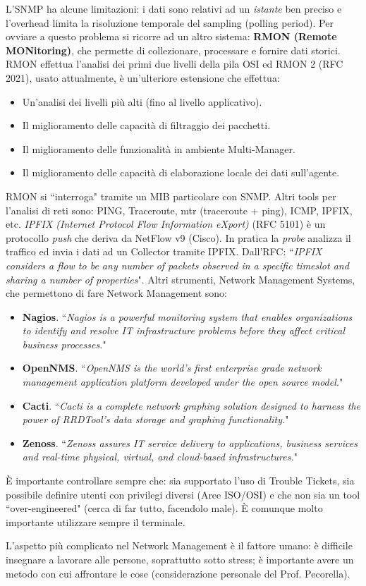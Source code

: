 L'SNMP ha alcune limitazioni: i dati sono relativi ad un \textit{istante} ben preciso e l'overhead limita la risoluzione temporale del sampling (polling period). Per ovviare a questo problema si ricorre ad un altro sistema: \textbf{RMON (Remote MONitoring)}, che permette di collezionare, processare e fornire dati storici. RMON effettua l'analisi dei primi due livelli della pila OSI ed RMON 2 (RFC 2021), usato attualmente, è un'ulteriore estensione che effettua:
\begin{itemize}
	\item Un'analisi dei livelli più alti (fino al livello applicativo).
	\item Il miglioramento delle capacità di filtraggio dei pacchetti.
	\item Il miglioramento delle funzionalità in ambiente Multi-Manager.
	\item Il miglioramento delle capacità di elaborazione locale dei dati sull'agente.
\end{itemize}
RMON si \textquotedblleft interroga" tramite un MIB particolare con SNMP. Altri tools per l'analisi di reti sono: PING, Traceroute, mtr (traceroute + ping), ICMP, IPFIX, etc. \textit{IPFIX (Internet Protocol Flow Information eXport)} (RFC 5101) è un protocollo \textit{push} che deriva da NetFlow v9 (Cisco). In pratica la \textit{probe} analizza il traffico ed invia i dati ad un Collector tramite IPFIX. Dall'RFC: \textquotedblleft \textit{IPFIX considers a flow to be any number of packets observed in a specific timeslot and sharing a number of properties}". Altri strumenti, Network Management Systems, che permettono di fare Network Management sono:
\begin{itemize}
	\item \textbf{Nagios}. \textquotedblleft \textit{Nagios is a powerful monitoring system that enables organizations to identify and resolve IT infrastructure problems before they affect critical business processes.}"
	\item \textbf{OpenNMS}. \textquotedblleft \textit{OpenNMS is the world's first enterprise grade network management application platform developed under the open source model.}"
	\item \textbf{Cacti}. \textquotedblleft \textit{Cacti is a complete network graphing solution designed to harness the power of RRDTool's data storage and graphing functionality.}"
	\item \textbf{Zenoss}. \textquotedblleft \textit{Zenoss assures IT service delivery to applications, business services and real-time physical, virtual, and cloud-based infrastructures.}"
\end{itemize}
È importante controllare sempre che: sia supportato l'uso di Trouble Tickets, sia possibile definire utenti con privilegi diversi (Aree ISO/OSI) e che non sia un tool \textquotedblleft over-engineered" (cerca di far tutto, facendolo male). È comunque molto importante utilizzare sempre il terminale.

L'aspetto più complicato nel Network Management è il fattore umano: è difficile insegnare a lavorare alle persone, soprattutto sotto stress; è importante avere un metodo con cui affrontare le cose (considerazione personale del Prof. Pecorella).